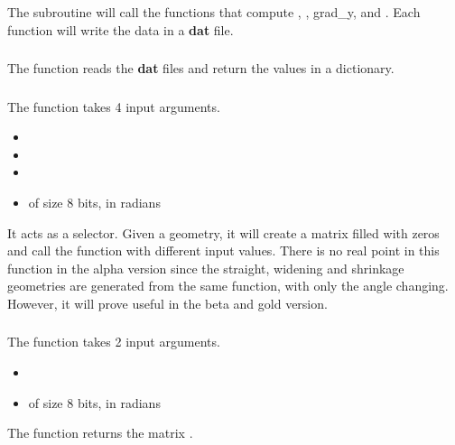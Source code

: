 \subsubsection{\textcolor{func}{}}
The subroutine \textcolor{func}{} will call the functions that compute ,
, grad\_y,  and . Each function
will write the data in a \textbf{dat} file.

\subsubsection{\textcolor{func}{}}
The function \textcolor{func}{} reads the \textbf{dat} files and return the
values in a dictionary.

\subsubsection{\textcolor{func}{}}
The function \textcolor{func}{} takes 4 input arguments.
\begin{itemize}
      \item {}
      \item {}
      \item {}
      \item {} of size 8 bits, in radians
\end{itemize}
It acts as a selector. Given a geometry, it will create a matrix  filled
with zeros and call the function \textcolor{func}{} with different input
values. There is no real point in this function in the alpha version since the
straight, widening and shrinkage geometries are generated from the same
function, with only the angle changing. However, it will prove useful in the
beta and gold version.

\subsubsection{\textcolor{func}{}}
The function \textcolor{func}{} takes 2 input arguments.
\begin{itemize}
      \item {} \textcolor{dtype}{}
      \item {} of size 8 bits, in radians
\end{itemize}
The function returns the matrix .

